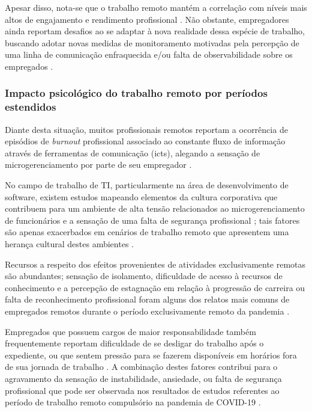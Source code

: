 \documentclass[12pt]{article}
\begin{document}
Apesar disso, nota-se que o trabalho remoto mantém a correlação com níveis mais altos de engajamento e rendimento profissional
\cite{ijerph2021,ntwe2017}. Não obstante, empregadores ainda reportam desafios ao se adaptar à nova realidade dessa espécie
de trabalho, buscando adotar novas medidas de monitoramento motivadas pela percepção de uma linha de comunicação enfraquecida
e/ou falta de observabilidade sobre os empregados \cite{hofschulteBeck2022}. 

\subsubsection{Impacto psicológico do trabalho remoto por períodos estendidos}

Diante desta situação, muitos profissionais remotos reportam a ocorrência de episódios de \textit{burnout} profissional
associado ao constante fluxo de informação através de ferramentas de comunicação (\gls{ict}s), alegando a sensação
de microgerenciamento por parte de seu empregador \cite{forbes2023}.

No campo de trabalho de TI, particularmente na área de desenvolvimento de software, existem estudos mapeando elementos da cultura
corporativa que contribuem para um ambiente de alta tensão relacionados ao microgerenciamento de funcionários e a sensação
de uma falta de segurança profissional \cite{trinkenreichorganization}; tais fatores são apenas exacerbados em cenários
de trabalho remoto que apresentem uma herança cultural destes ambientes \cite{ijerph2021}.

Recursos a respeito dos efeitos provenientes de atividades exclusivamente remotas são abundantes; sensação de
isolamento, dificuldade de acesso à recursos de conhecimento e a percepção de estagnação em relação à progressão de
carreira ou falta de reconhecimento profissional foram alguns dos relatos mais comuns de empregados remotos durante o
período exclusivamente remoto da pandemia \cite{ijerph2021,forbes2023,hofschulteBeck2022}. 

Empregados que possuem cargos de maior responsabilidade também frequentemente reportam dificuldade de se desligar do trabalho
após o expediente, ou que sentem pressão para se fazerem disponíveis em horários fora de sua jornada de trabalho \cite{ijerph2021}.
A combinação destes fatores contribui para o agravamento da sensação de instabilidade, ansiedade, ou falta de segurança
profissional que pode ser observada nos resultados de estudos referentes ao período de trabalho remoto compulsório na pandemia
de COVID-19 \cite{ijerph2021}.
\end{document}
